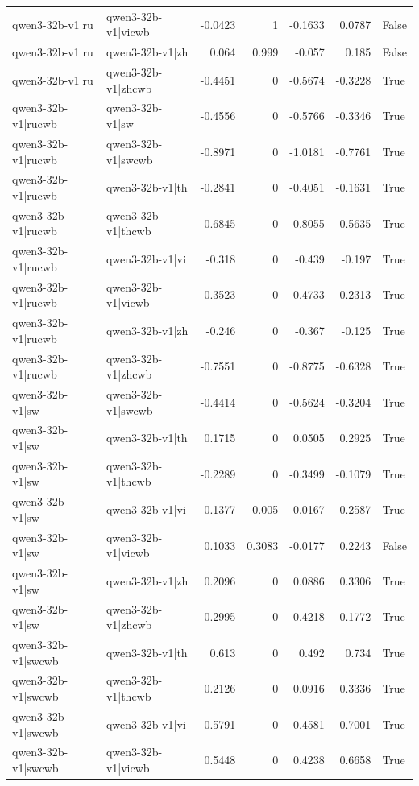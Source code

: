 \begin{table}
\begin{tabular}{l l r r r r l}
qwen3-32b-v1|ru & qwen3-32b-v1|vicwb & -0.0423 & 1 & -0.1633 & 0.0787 & False \\
qwen3-32b-v1|ru & qwen3-32b-v1|zh & 0.064 & 0.999 & -0.057 & 0.185 & False \\
qwen3-32b-v1|ru & qwen3-32b-v1|zhcwb & -0.4451 & 0 & -0.5674 & -0.3228 & True \\
qwen3-32b-v1|rucwb & qwen3-32b-v1|sw & -0.4556 & 0 & -0.5766 & -0.3346 & True \\
qwen3-32b-v1|rucwb & qwen3-32b-v1|swcwb & -0.8971 & 0 & -1.0181 & -0.7761 & True \\
qwen3-32b-v1|rucwb & qwen3-32b-v1|th & -0.2841 & 0 & -0.4051 & -0.1631 & True \\
qwen3-32b-v1|rucwb & qwen3-32b-v1|thcwb & -0.6845 & 0 & -0.8055 & -0.5635 & True \\
qwen3-32b-v1|rucwb & qwen3-32b-v1|vi & -0.318 & 0 & -0.439 & -0.197 & True \\
qwen3-32b-v1|rucwb & qwen3-32b-v1|vicwb & -0.3523 & 0 & -0.4733 & -0.2313 & True \\
qwen3-32b-v1|rucwb & qwen3-32b-v1|zh & -0.246 & 0 & -0.367 & -0.125 & True \\
qwen3-32b-v1|rucwb & qwen3-32b-v1|zhcwb & -0.7551 & 0 & -0.8775 & -0.6328 & True \\
qwen3-32b-v1|sw & qwen3-32b-v1|swcwb & -0.4414 & 0 & -0.5624 & -0.3204 & True \\
qwen3-32b-v1|sw & qwen3-32b-v1|th & 0.1715 & 0 & 0.0505 & 0.2925 & True \\
qwen3-32b-v1|sw & qwen3-32b-v1|thcwb & -0.2289 & 0 & -0.3499 & -0.1079 & True \\
qwen3-32b-v1|sw & qwen3-32b-v1|vi & 0.1377 & 0.005 & 0.0167 & 0.2587 & True \\
qwen3-32b-v1|sw & qwen3-32b-v1|vicwb & 0.1033 & 0.3083 & -0.0177 & 0.2243 & False \\
qwen3-32b-v1|sw & qwen3-32b-v1|zh & 0.2096 & 0 & 0.0886 & 0.3306 & True \\
qwen3-32b-v1|sw & qwen3-32b-v1|zhcwb & -0.2995 & 0 & -0.4218 & -0.1772 & True \\
qwen3-32b-v1|swcwb & qwen3-32b-v1|th & 0.613 & 0 & 0.492 & 0.734 & True \\
qwen3-32b-v1|swcwb & qwen3-32b-v1|thcwb & 0.2126 & 0 & 0.0916 & 0.3336 & True \\
qwen3-32b-v1|swcwb & qwen3-32b-v1|vi & 0.5791 & 0 & 0.4581 & 0.7001 & True \\
qwen3-32b-v1|swcwb & qwen3-32b-v1|vicwb & 0.5448 & 0 & 0.4238 & 0.6658 & True \\

\end{tabular}
\end{table}
